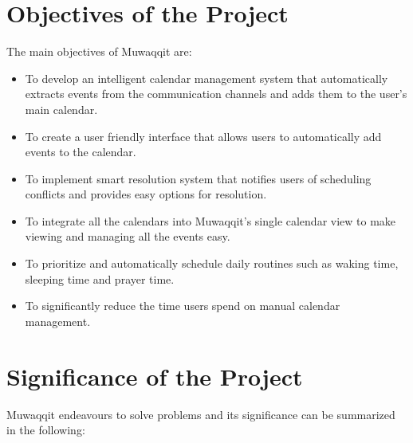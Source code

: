 \documentclass[12pt,a4paper]{article}
\begin{document}
\section{Objectives of the Project}

The main objectives of Muwaqqit are:

\begin{itemize}
    \item To develop an intelligent calendar management system that automatically extracts events from the communication channels and adds them to the user's main calendar.
    \item To create a user friendly interface that allows users to automatically add events to the calendar.
    \item To implement smart resolution system that notifies users of scheduling conflicts and provides easy options for resolution.
    \item To integrate all the calendars into Muwaqqit's single calendar view to make viewing and managing all the events easy.
    \item To prioritize and automatically schedule daily routines such as waking time, sleeping time and prayer time.
    \item To significantly reduce the time users spend on manual calendar management.
\end{itemize}

\section{Significance of the Project}

Muwaqqit endeavours to solve problems and its significance can be summarized in the following:
\end{document}

